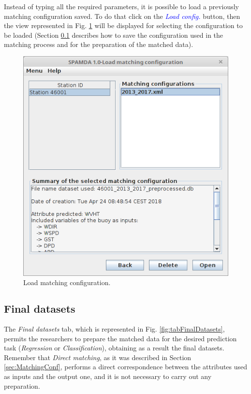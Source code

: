 \begin{onehalfspace}
				Instead of typing all the required parameters, it is possible to load a previously matching configuration saved. To do that click on the \textcolor{blue}{\textit{Load config.}} button, then the view represented in Fig. \ref{fig:selectingMatchingConfiguration} will be displayed for selecting the configuration to be loaded (Section \ref{sec:FinalDatasets} describes how to save the configuration used in the matching process and for the preparation of the matched data).
				
				\begin{figure}[ht!]
					\centering
					\includegraphics[scale=0.40]{figures/selectingMatchingConfiguration.png}
					\caption{Load matching configuration.}
					\label{fig:selectingMatchingConfiguration}
				\end{figure}
				

			\subsection{Final datasets}\label{sec:FinalDatasets}
			
				The \textit{Final datasets} tab, which is represented in Fig. \ref{fig:tabFinalDatasets}, permits the researchers to prepare the matched data for the desired prediction task (\textit{Regression} or \textit{Classification}), obtaining as a result the final datasets. Remember that \textit{Direct matching}, as it was described in Section \ref{sec:MatchingConf}, performs a direct correspondence between the attributes used as inputs and the output one, and it is not necessary to carry out any preparation.
				

\end{onehalfspace}
